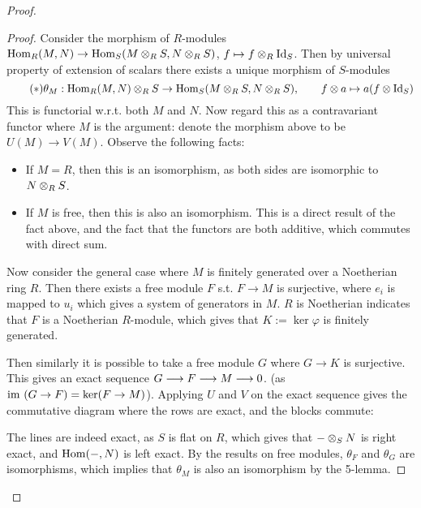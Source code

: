\documentclass{article}
\begin{document}
\begin{proof}
\begin{enumerate}
        \begin{proof}
            Consider the morphism of $R$-modules $\mathrm{Hom}_R(M, N) \to \mathrm{Hom}_S(M \otimes_R S, N \otimes_R S)$, $f \mapsto f \otimes_R \mathrm{Id}_S$. Then by universal property of extension of scalars there exists a unique morphism of $S$-modules
            \begin{equation}\tag{$\ast$}
                \theta_M: \mathrm{Hom}_R(M, N) \otimes_R S \to \mathrm{Hom}_S(M \otimes_R S, N \otimes_R S), \qquad f \otimes a \mapsto a (f \otimes \mathrm{Id}_S)
            \end{equation}
            This is functorial w.r.t. both $M$ and $N$. Now regard this as a contravariant functor where $M$ is the argument: denote the morphism above to be $U(M) \to V(M)$. Observe the following facts:
            \begin{itemize}
                \item If $M = R$, then this is an isomorphism, as both sides are isomorphic to $N \otimes_R S$. 
                \item If $M$ is free, then this is also an isomorphism. This is a direct result of the fact above, and the fact that the functors are both additive, which commutes with direct sum.
            \end{itemize}
            Now consider the general case where $M$ is finitely generated over a Noetherian ring $R$. Then there exists a free module $F$ s.t. $F \to M$ is surjective, where $e_i$ is mapped to $u_i$ which gives a system of generators in $M$. $R$ is Noetherian indicates that $F$ is a Noetherian $R$-module, which gives that $K := \ker \varphi$ is finitely generated.

            Then similarly it is possible to take a free module $G$ where $G \to K$ is surjective. This gives an exact sequence $G \longrightarrow F \longrightarrow M \longrightarrow 0$. (as $\mathrm{im}\  (G \to F) = \ker (F \to M)$). Applying $U$ and $V$ on the exact sequence gives the commutative diagram where the rows are exact, and the blocks commute:
            \begin{figure}[htbp]
                \centering
            \end{figure}
            The lines are indeed exact, as $S$ is flat on $R$, which gives that $- \otimes_S N$ is right exact, and $\mathrm{Hom}(-, N)$ is left exact. By the results on free modules, $\theta_F$ and $\theta_G$ are isomorphisms, which implies that $\theta_M$ is also an isomorphism by the 5-lemma. 
        \end{proof}


\end{enumerate}
\end{proof}
\end{document}
